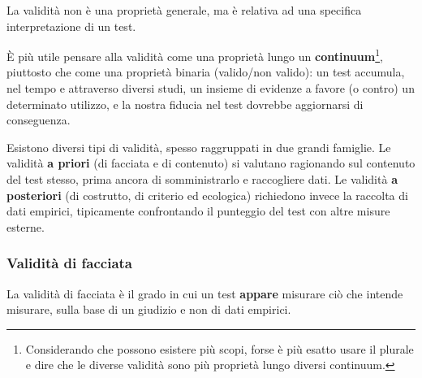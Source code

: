 \documentclass[
  italian,
  letterpaper,
  paper=6in:9in,
  pagesize=pdftex,
  headinclude=on,
  footinclude=on,
  11pt]{scrbook}
\begin{document}
\begin{tcolorbox}[enhanced jigsaw, title=\textcolor{quarto-callout-tip-color}{\faLightbulb}\hspace{0.5em}{Non ha senso dire che un test ``è valido''.}, coltitle=black, bottomtitle=1mm, colback=white, bottomrule=.15mm, rightrule=.15mm, breakable, toptitle=1mm, left=2mm, colbacktitle=quarto-callout-tip-color!10!white, titlerule=0mm, colframe=quarto-callout-tip-color-frame, leftrule=.75mm, opacitybacktitle=0.6, arc=.35mm, toprule=.15mm, opacityback=0]

La validità non è una proprietà generale, ma è relativa ad una specifica
interpretazione di un test.

\end{tcolorbox}

È più utile pensare alla validità come una proprietà lungo un
\textbf{continuum}\footnote{Considerando che possono esistere più scopi,
  forse è più esatto usare il plurale e dire che le diverse validità
  sono più proprietà lungo diversi continuum.}, piuttosto che come una
proprietà binaria (valido/non valido): un test accumula, nel tempo e
attraverso diversi studi, un insieme di evidenze a favore (o contro) un
determinato utilizzo, e la nostra fiducia nel test dovrebbe aggiornarsi
di conseguenza.

Esistono diversi tipi di validità, spesso raggruppati in due grandi
famiglie. Le validità \textbf{a priori} (di facciata e di contenuto) si
valutano ragionando sul contenuto del test stesso, prima ancora di
somministrarlo e raccogliere dati. Le validità \textbf{a posteriori} (di
costrutto, di criterio ed ecologica) richiedono invece la raccolta di
dati empirici, tipicamente confrontando il punteggio del test con altre
misure esterne.

\subsubsection{Validità di facciata}\label{validituxe0-di-facciata}

\begin{tcolorbox}[enhanced jigsaw, title=\textcolor{quarto-callout-note-color}{\faInfo}\hspace{0.5em}{Definizione}, coltitle=black, bottomtitle=1mm, colback=white, bottomrule=.15mm, rightrule=.15mm, breakable, toptitle=1mm, left=2mm, colbacktitle=quarto-callout-note-color!10!white, titlerule=0mm, colframe=quarto-callout-note-color-frame, leftrule=.75mm, opacitybacktitle=0.6, arc=.35mm, toprule=.15mm, opacityback=0]

La validità di facciata è il grado in cui un test \textbf{appare}
misurare ciò che intende misurare, sulla base di un giudizio e non di
dati empirici.

\end{tcolorbox}
\end{document}

